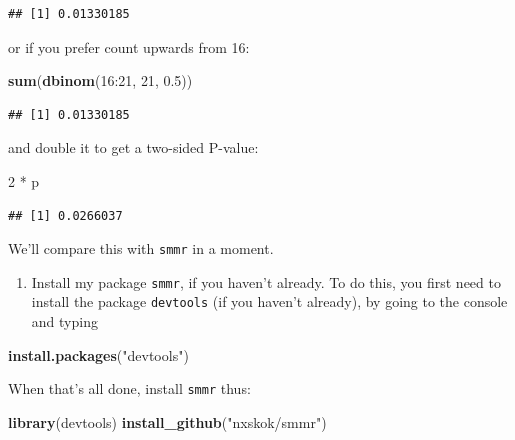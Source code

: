 \documentclass[]{tufte-book}
\newenvironment{Shaded}{}{}
\newcommand{\DecValTok}[1]{\textcolor[rgb]{0.25,0.63,0.44}{#1}}
\newcommand{\FloatTok}[1]{\textcolor[rgb]{0.25,0.63,0.44}{#1}}
\newcommand{\KeywordTok}[1]{\textcolor[rgb]{0.00,0.44,0.13}{\textbf{#1}}}
\newcommand{\NormalTok}[1]{#1}
\newcommand{\OperatorTok}[1]{\textcolor[rgb]{0.40,0.40,0.40}{#1}}
\newcommand{\StringTok}[1]{\textcolor[rgb]{0.25,0.44,0.63}{#1}}
\providecommand{\tightlist}{%
  \setlength{\itemsep}{0pt}\setlength{\parskip}{0pt}}
\theoremstyle{definition}
\theoremstyle{definition}
\theoremstyle{definition}
\theoremstyle{remark}
\begin{document}
\begin{verbatim}
## [1] 0.01330185
\end{verbatim}

or if you prefer count upwards from 16:

\begin{Shaded}
\begin{Highlighting}[]
\KeywordTok{sum}\NormalTok{(}\KeywordTok{dbinom}\NormalTok{(}\DecValTok{16}\OperatorTok{:}\DecValTok{21}\NormalTok{, }\DecValTok{21}\NormalTok{, }\FloatTok{0.5}\NormalTok{))}
\end{Highlighting}
\end{Shaded}

\begin{verbatim}
## [1] 0.01330185
\end{verbatim}

and double it to get a two-sided P-value:

\begin{Shaded}
\begin{Highlighting}[]
\DecValTok{2} \OperatorTok{*}\StringTok{ }\NormalTok{p}
\end{Highlighting}
\end{Shaded}

\begin{verbatim}
## [1] 0.0266037
\end{verbatim}

We'll compare this with \texttt{smmr} in a moment.

\begin{enumerate}
\def\labelenumi{(\alph{enumi})}
\setcounter{enumi}{2}
\tightlist
\item
  Install my package \texttt{smmr}, if you haven't already. To do this,
  you first need to install the package \texttt{devtools} (if you
  haven't already), by going to the console and typing
\end{enumerate}

\begin{Shaded}
\begin{Highlighting}[]
\KeywordTok{install.packages}\NormalTok{(}\StringTok{"devtools"}\NormalTok{)}
\end{Highlighting}
\end{Shaded}

When that's all done, install \texttt{smmr} thus:

\begin{Shaded}
\begin{Highlighting}[]
\KeywordTok{library}\NormalTok{(devtools)}
\KeywordTok{install_github}\NormalTok{(}\StringTok{"nxskok/smmr"}\NormalTok{)}
\end{Highlighting}
\end{Shaded}
\end{document}
